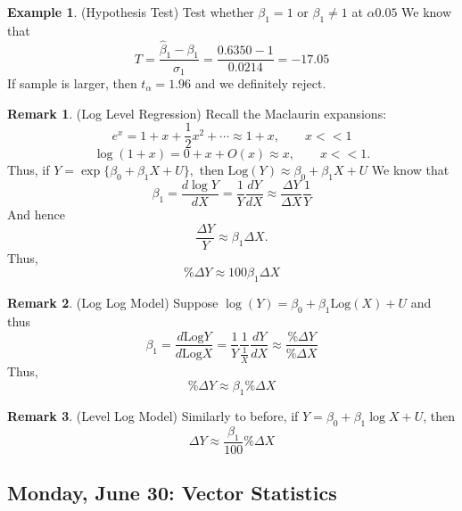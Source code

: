 \documentclass[10pt, oneside]{article}
\newcommand{\Log}{\text{Log}}
\theoremstyle{definition}
\newtheorem{exmp}{Example}[section]
\newtheorem{rem}{Remark}
\begin{document}
\begin{exmp}
    (Hypothesis Test) Test whether $\beta_1 = 1$ or $\beta_1 \neq 1$ at $\alpha 0.05$ We know that 
    \[T = \frac{\hat\beta_1 - \beta_1}{\hat\sigma_1} = \frac{0.6350  -1}{0.0214} = -17.05\] If sample is larger, then $t_\alpha = 1.96$ and we definitely reject.
\end{exmp}

\begin{rem}
(Log Level Regression)
    Recall the Maclaurin expansions:
    \[e^x = 1 + x + \frac{1}{2}x^2 + \cdots \approx 1 + x, \qquad x<<1\]
    \[\log(1+x) = 0 + x + O(x) \approx x, \qquad x<<1.\] Thus, if $Y = \exp\{\beta_0 + \beta_1X + U\},$ then $\Log(Y) \approx \beta_0 + \beta_1 X + U$
    We know that 
    \[\beta_1 = \frac{d\log Y}{dX} = \frac{1}{Y} \frac{dY}{dX} \approx \frac{\Delta Y}{\Delta X}\frac{1}{Y}\] And hence 
    \[\frac{\Delta Y}{Y} \approx \beta_1 \Delta X.\] Thus, 
    \[\boxed{\% \Delta Y \approx 100 \beta_1 \Delta X}\]
\end{rem}

\begin{rem}
    (Log Log Model)
    Suppose $\log(Y) = \beta_0 + \beta_1 \Log(X) + U$ and thus 
    \[\beta_1 = \frac{d\Log Y}{d\Log X} = \frac{1}{Y} \frac{1}{\frac{1}{X}}\frac{dY}{dX}\approx \frac{\% \Delta Y}{\% \Delta X}\] Thus, 
    \[\boxed{\%\Delta Y \approx \beta_1 \%\Delta X}\]
\end{rem}
\begin{rem}
    (Level Log Model) Similarly to before, if 
    $ Y = \beta_0 + \beta_1 \log X + U$, then 
    \[\boxed{\Delta Y \approx \frac{\beta_1}{100}\% \Delta X}\]
\end{rem}


\newpage
\subsection{Monday, June 30: Vector Statistics}
\end{document}
